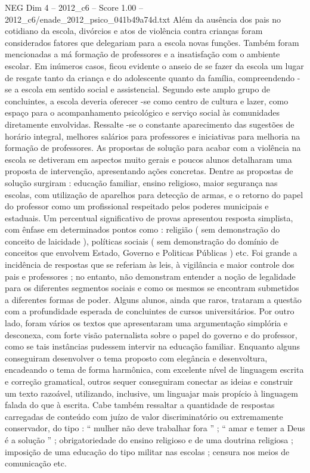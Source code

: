 \begin{textsample}{NEG Dim 4 – 2012\_c6 – Score 1.00 – 2012\_c6/enade\_2012\_psico\_041b49a74d.txt}
Além da ausência dos pais no cotidiano da escola, divórcios e atos de violência contra crianças foram considerados fatores que delegariam para a escola novas funções.
Também foram mencionadas a má formação de professores e a insatisfação com o ambiente escolar.
Em inúmeros casos, ficou evidente o anseio de se fazer da escola um lugar de resgate tanto da criança e do adolescente quanto da família, compreendendo -se a escola em sentido social e assistencial.
Segundo este amplo grupo de concluintes, a escola deveria oferecer -se como centro de cultura e lazer, como espaço para o acompanhamento psicológico e serviço social às comunidades diretamente envolvidas.
Ressalte -se o constante aparecimento das sugestões de horário integral, melhores salários para professores e iniciativas para melhoria na formação de professores.
As propostas de solução para acabar com a violência na escola se detiveram em aspectos muito gerais e poucos alunos detalharam uma proposta de intervenção, apresentando ações concretas.
Dentre as propostas de solução surgiram : educação familiar, ensino religioso, maior segurança nas escolas, com utilização de aparelhos para detecção de armas, e o retorno do papel do professor como um profissional respeitado pelos poderes municipais e estaduais.
Um percentual significativo de provas apresentou resposta simplista, com ênfase em determinados pontos como : religião ( sem demonstração do conceito de laicidade ), políticas sociais ( sem demonstração do domínio de conceitos que envolvem Estado, Governo e Politicas Públicas ) etc.
Foi grande a incidência de respostas que se referiam às leis, à vigilância e maior controle dos pais e professores ; no entanto, não demonstram entender a noção de legalidade para os diferentes segmentos sociais e como os mesmos se encontram submetidos a diferentes formas de poder.
Alguns alunos, ainda que raros, trataram a questão com a profundidade esperada de concluintes de cursos universitários.
Por outro lado, foram vários os textos que apresentaram uma argumentação simplória e desconexa, com forte visão paternalista sobre o papel do governo e do professor, como se tais instâncias pudessem intervir na educação familiar.
Enquanto alguns conseguiram desenvolver o tema proposto com elegância e desenvoltura, encadeando o tema de forma harmônica, com excelente nível de linguagem escrita e correção gramatical, outros sequer conseguiram conectar as ideias e construir um texto razoável, utilizando, inclusive, um linguajar mais propício à linguagem falada do que à escrita.
Cabe também ressaltar a quantidade de respostas carregadas de conteúdo com juízo de valor discriminatório ou extremamente conservador, do tipo : “ mulher não deve trabalhar fora ” ; “ amar e temer a Deus é a solução ” ; obrigatoriedade do ensino religioso e de uma doutrina religiosa ; imposição de uma educação do tipo militar nas escolas ; censura nos meios de comunicação etc.

\end{textsample}
